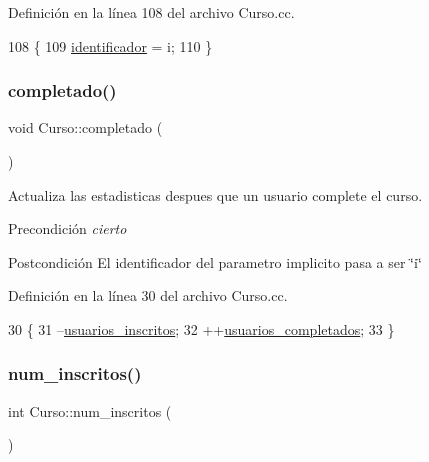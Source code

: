 Definición en la línea 108 del archivo Curso.\+cc.


\begin{DoxyCode}
108                              \{
109   \mbox{\hyperlink{class_curso_aa719041069be2a3f1a093a881ae7a105}{identificador}} = i;
110 \}
\end{DoxyCode}
\mbox{\label{class_curso_a832e6ccf726c8534162079e9a041aac9}} 
\subsubsection{\texorpdfstring{completado()}{completado()}}
{\footnotesize\ttfamily void Curso\+::completado (\begin{DoxyParamCaption}{ }\end{DoxyParamCaption})}



Actualiza las estadisticas despues que un usuario complete el curso. 

\begin{DoxyPrecond}{Precondición}
{\itshape cierto} 
\end{DoxyPrecond}
\begin{DoxyPostcond}{Postcondición}
El identificador del parametro implicito pasa a ser \char`\"{}i\char`\"{} 
\end{DoxyPostcond}


Definición en la línea 30 del archivo Curso.\+cc.


\begin{DoxyCode}
30                       \{
31   --\mbox{\hyperlink{class_curso_a94c41191b9cd9dc8af95e7d2560a2381}{usuarios\_inscritos}};
32   ++\mbox{\hyperlink{class_curso_a63f5480299c87c260ba262831ba7a86f}{usuarios\_completados}};
33 \}
\end{DoxyCode}
\mbox{\label{class_curso_aca56beb776cf49d4c330e446032cd572}} 
\subsubsection{\texorpdfstring{num\+\_\+inscritos()}{num\_inscritos()}}
{\footnotesize\ttfamily int Curso\+::num\+\_\+inscritos (\begin{DoxyParamCaption}{ }\end{DoxyParamCaption})}



